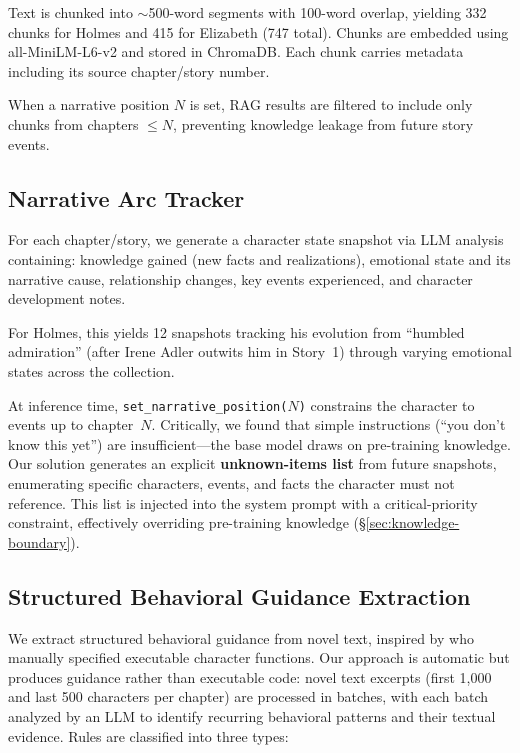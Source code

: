\documentclass[11pt,a4paper]{article}
\begin{document}
Text is chunked into $\sim$500-word segments with 100-word overlap, yielding 332 chunks for Holmes and 415 for Elizabeth (747 total).
Chunks are embedded using all-MiniLM-L6-v2 \citep{reimers2019sentence} and stored in ChromaDB.
Each chunk carries metadata including its source chapter/story number.

When a narrative position $N$ is set, RAG results are filtered to include only chunks from chapters $\leq N$, preventing knowledge leakage from future story events.

\subsection{Narrative Arc Tracker}
\label{sec:arc}

For each chapter/story, we generate a character state snapshot via LLM analysis containing:
knowledge gained (new facts and realizations),
emotional state and its narrative cause,
relationship changes,
key events experienced, and
character development notes.

For Holmes, this yields 12 snapshots tracking his evolution from ``humbled admiration'' (after Irene Adler outwits him in Story~1) through varying emotional states across the collection.

At inference time, \texttt{set\_narrative\_position($N$)} constrains the character to events up to chapter~$N$.
Critically, we found that simple instructions (``you don't know this yet'') are insufficient---the base model draws on pre-training knowledge.
Our solution generates an explicit \textbf{unknown-items list} from future snapshots, enumerating specific characters, events, and facts the character must not reference.
This list is injected into the system prompt with a critical-priority constraint, effectively overriding pre-training knowledge (\S\ref{sec:knowledge-boundary}).

\subsection{Structured Behavioral Guidance Extraction}
\label{sec:logic}

We extract structured behavioral guidance from novel text, inspired by \citet{codifiedlogic2025} who manually specified executable character functions.
Our approach is automatic but produces guidance rather than executable code: novel text excerpts (first 1,000 and last 500 characters per chapter) are processed in batches, with each batch analyzed by an LLM to identify recurring behavioral patterns and their textual evidence.
Rules are classified into three types:
\end{document}
